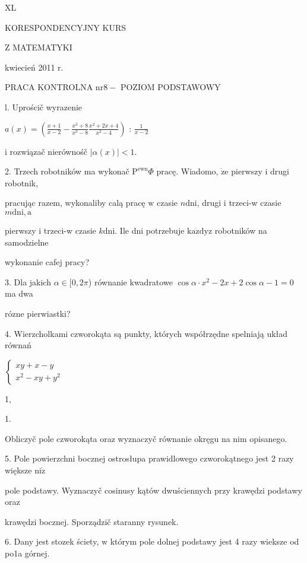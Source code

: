 \documentclass[a4paper,12pt]{article}
\begin{document}
XL

KORESPONDENCYJNY KURS

Z MATEMATYKI

kwiecień 2011 r.

PRACA KONTROLNA $\mathrm{n}\mathrm{r} 8-$ POZIOM PODSTAWOWY

l. Uprościč wyrazenie

$a(x)= (\displaystyle \frac{x+1}{x-2}-\frac{x^{3}+8}{x^{3}-8}\frac{x^{2}+2x+4}{x^{2}-4})$ : $\displaystyle \frac{1}{x-2}$

$\mathrm{i}$ rozwiązač nierównośč $|\alpha(x)|<1.$

2. Trzech robotników ma wykonač $\mathrm{P}^{\mathrm{e}\mathrm{w}\mathrm{n}}\Phi$ pracę. Wiadomo, $\dot{\mathrm{z}}\mathrm{e}$ pierwszy $\mathrm{i}$ drugi robotnik,

pracując razem, wykonaliby calą pracę $\mathrm{w}$ czasie $n\mathrm{d}\mathrm{n}\mathrm{i}$, drugi $\mathrm{i}$ trzeci-w czasie $m\mathrm{d}\mathrm{n}\mathrm{i}, \mathrm{a}$

pierwszy $\mathrm{i}$ trzeci-w czasie $k\mathrm{d}\mathrm{n}\mathrm{i}$. Ile dni potrzebuje $\mathrm{k}\mathrm{a}\dot{\mathrm{z}}\mathrm{d}\mathrm{y}\mathrm{z}$ robotników na samodzielne

wykonanie cafej pracy?

3. Dla jakich $\alpha\in [0,2\pi$) równanie kwadratowe $\cos\alpha\cdot x^{2}-2x+2\cos\alpha-1=0$ ma dwa

rózne pierwiastki?

4. Wierzcholkami czworokąta są punkty, których współrzędne spelniają układ równań

$\left\{\begin{array}{l}
xy+x-y\\
x^{2}-xy+y^{2}
\end{array}\right.$

1,

1.

Obliczyč pole czworokąta oraz wyznaczyč równanie okręgu na nim opisanego.

5. Pole powierzchni bocznej ostrosłupa prawidlowego czworokątnego jest 2 razy większe $\mathrm{n}\mathrm{i}\dot{\mathrm{z}}$

pole podstawy. Wyznaczyč cosinusy kątów dwuściennych przy krawędzi podstawy oraz

krawędzi bocznej. Sporządzič staranny rysunek.

6. Dany jest stozek ściety, $\mathrm{w}$ którym pole dolnej podstawy jest 4 razy wieksze od po1a górnej.
\end{document}
